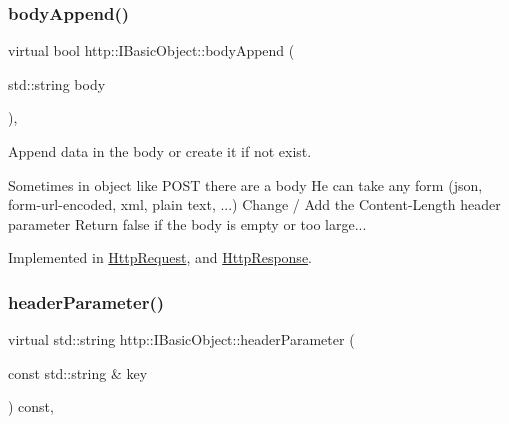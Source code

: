\mbox{\label{structhttp_1_1IBasicObject_abf2cb4a0e7908313b827ad4635bad730}} 
\subsubsection{\texorpdfstring{body\+Append()}{bodyAppend()}}
{\footnotesize\ttfamily virtual bool http\+::\+I\+Basic\+Object\+::body\+Append (\begin{DoxyParamCaption}\item[{std\+::string}]{body }\end{DoxyParamCaption})\hspace{0.3cm}{\ttfamily [pure virtual]}, {\ttfamily [noexcept]}}



Append data in the body or create it if not exist. 

Sometimes in object like P\+O\+ST there are a body He can take any form (json, form-\/url-\/encoded, xml, plain text, ...) Change / Add the \textquotesingle{}Content-\/\+Length\textquotesingle{} header parameter Return false if the body is empty or too large... 

Implemented in \hyperlink{classHttpRequest_afd8f9f22651d2844b7b2d4cb882b7e19}{Http\+Request}, and \hyperlink{classHttpResponse_af8f8669568d6bcc7b0e3c7a247e456bd}{Http\+Response}.

\mbox{\label{structhttp_1_1IBasicObject_a17f97dd4917fdd7dd694d3d191eaebca}} 
\subsubsection{\texorpdfstring{header\+Parameter()}{headerParameter()}\hspace{0.1cm}{\footnotesize\ttfamily [1/2]}}
{\footnotesize\ttfamily virtual std\+::string http\+::\+I\+Basic\+Object\+::header\+Parameter (\begin{DoxyParamCaption}\item[{const std\+::string \&}]{key }\end{DoxyParamCaption}) const\hspace{0.3cm}{\ttfamily [pure virtual]}, {\ttfamily [noexcept]}}



